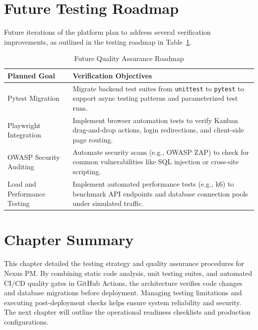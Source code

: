 \section{Future Testing Roadmap}
Future iterations of the platform plan to address several verification improvements, as outlined in the testing roadmap in Table~\ref{tab:testing_roadmap}.

\begin{table}[h!]
\centering
\small
\renewcommand{\arraystretch}{1.4}
\begin{tabularx}{\textwidth}{l X}
    \toprule[1.5pt]
    \rowcolor{primary!5}
    \textbf{\color{primary}Planned Goal} & \textbf{\color{primary}Verification Objectives} \\
    \midrule
    Pytest Migration & Migrate backend test suites from \texttt{unittest} to \texttt{pytest} to support async testing patterns and parameterized test runs. \\
    Playwright Integration & Implement browser automation tests to verify Kanban drag-and-drop actions, login redirections, and client-side page routing. \\
    OWASP Security Auditing & Automate security scans (e.g., OWASP ZAP) to check for common vulnerabilities like SQL injection or cross-site scripting. \\
    Load and Performance Testing & Implement automated performance tests (e.g., k6) to benchmark API endpoints and database connection pools under simulated traffic. \\
    \bottomrule[1.5pt]
\end{tabularx}
\caption{Future Quality Assurance Roadmap}
\label{tab:testing_roadmap}
\end{table}

\section{Chapter Summary}
This chapter detailed the testing strategy and quality assurance procedures for Nexus PM. By combining static code analysis, unit testing suites, and automated CI/CD quality gates in GitHub Actions, the architecture verifies code changes and database migrations before deployment. Managing testing limitations and executing post-deployment checks helps ensure system reliability and security. The next chapter will outline the operational readiness checklists and production configurations.
